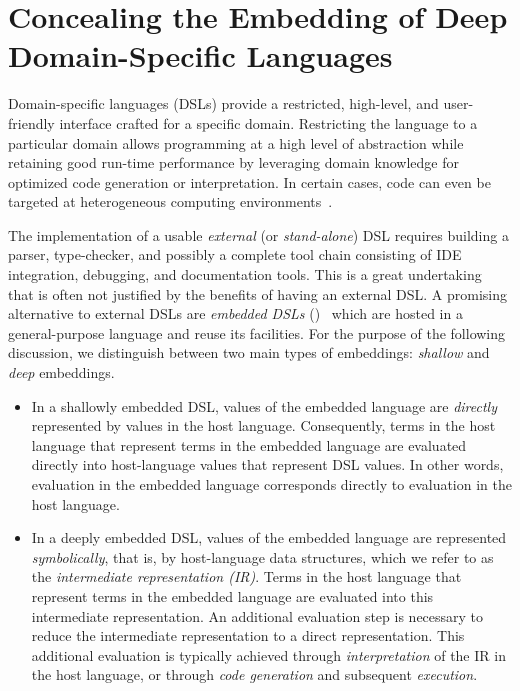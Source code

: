 
\chapter{Concealing the Embedding of Deep Domain-Specific Languages}

Domain-specific languages (DSLs) provide a restricted,
high-level, and user-friendly interface crafted for a specific domain.
Restricting the language to a particular domain allows programming at
a high level of abstraction while retaining good run-time performance
by leveraging domain knowledge for optimized code generation or
interpretation.  In certain cases, code can even be targeted at
heterogeneous computing environments~\cite{rompf_optimizing_2013}.

The implementation of a usable \emph{external} (or \emph{stand-alone})
DSL requires building a parser, type-checker, and possibly a complete
tool chain consisting of IDE integration, debugging, and documentation
tools. This is a great undertaking that is often not justified by the
benefits of having an external DSL.  A promising alternative to
external DSLs are \emph{embedded DSLs} (\edsls)~\cite{Hudak96csur}
which are hosted in a general-purpose language and reuse its
facilities. For the purpose of the following discussion, we
distinguish between two main types of embeddings: \emph{shallow} and
\emph{deep} embeddings.

  \begin{itemize}
  \item In a shallowly embedded DSL, values of the embedded language
    are \emph{directly} represented by values in the host language.
    Consequently, terms in the host language that represent terms in
    the embedded language are evaluated directly into host-language
    values that represent DSL values. In other words, evaluation in
    the embedded language corresponds directly to evaluation in the
    host language.
  \item In a deeply embedded DSL, values of the embedded language are
    represented \emph{symbolically}, that is, by host-language data
    structures, which we refer to as the \emph{intermediate
      representation (IR)}. Terms in the host language that represent
    terms in the embedded language are evaluated into this intermediate
    representation. An additional evaluation step is necessary to
    reduce the intermediate representation to a direct representation.
    This additional evaluation is typically achieved through
    \emph{interpretation} of the IR in the host language, or through
    \emph{code generation} and subsequent \emph{execution}.
  \end{itemize}

